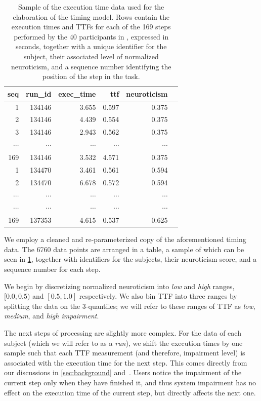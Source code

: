 \begin{table}
\centering
\caption[A]{%
    Sample of the execution time data  used for the elaboration of the timing model.
    Rows contain the execution times and \acp{TTF} for each of the \num{169} steps performed by the \num{40} participants in \textcite{olguinmunoz:impact2021}, expressed in seconds, together with a unique identifier for the subject, their associated level of normalized neuroticism, and a sequence number identifying the position of the step in the task.
}\label{tab:data:exectime}
\begin{tabular}{rrrrrr}
    \toprule
    {seq} & {run\_id} & {exec\_time} & {ttf} & {neuroticism}\\
    \midrule
    1 & 134146 & 3.655 & 0.597 & 0.375\\
    2 & 134146 & 4.439 & 0.554 & 0.375\\
    3 & 134146 & 2.943 & 0.562 & 0.375\\
    \( \cdots \) & \( \cdots \) & \( \cdots \) & \( \cdots \) & \( \cdots \) \\
    169 & 134146 & 3.532 & 4.571 & 0.375\\
    1 & 134470 & 3.461 & 0.561 & 0.594\\
    2 & 134470 & 6.678 & 0.572 & 0.594\\
    \( \cdots \) & \( \cdots \) & \( \cdots \) & \( \cdots \) & \( \cdots \) \\
    \( \cdots \) & \( \cdots \) & \( \cdots \) & \( \cdots \) & \( \cdots \) \\
    169 & 137353 & 4.615 & 0.537 & 0.625\\
    \bottomrule
    \end{tabular}
\end{table}

We employ a cleaned and re-parameterized copy of the aforementioned timing data.
The \num{6760} data points are arranged in a table, a sample of which can be seen in \cref{tab:data:exectime}, together with identifiers for the subjects, their neuroticism score, and a sequence number for each step.

We begin by discretizing normalized neuroticism into \emph{low} and \emph{high} ranges, \( [0.0, 0.5) \) and \( [0.5, 1.0] \) respectively. 
We also bin \ac{TTF} into three ranges by splitting the data on the 3-quantiles; we will refer to these ranges of \ac{TTF} as \emph{low}, \emph{medium}, and \emph{high impairment}.

The next steps of processing are slightly more complex.
For the data of each subject (which we will refer to as a \emph{run}), we shift the execution times by one sample such that each \ac{TTF} measurement (and therefore, impairment level) is associated with the execution time for the next step.
This comes directly from our discussions in \cref{sec:background} and~\cite{olguinmunoz:impact2021}.
Users notice the impairment of the current step only when they have finished it, and thus system impairment has no effect on the execution time of the current step, but directly affects the next one.

